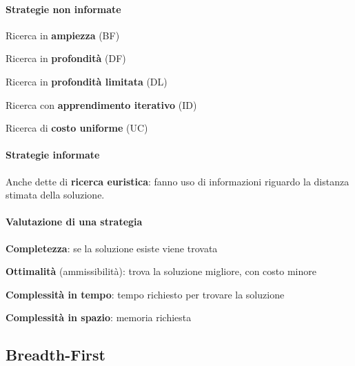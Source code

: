 \documentclass[10pt]{book}
\begin{document}
\paragraph{Strategie non informate}
\begin{list}{}{}
	\item Ricerca in \textbf{ampiezza} (BF)
	\item Ricerca in \textbf{profondità} (DF)
	\item Ricerca in \textbf{profondità limitata} (DL)
	\item Ricerca con \textbf{apprendimento iterativo} (ID)
	\item Ricerca di \textbf{costo uniforme} (UC)
\end{list}
\paragraph{Strategie informate} Anche dette di \textbf{ricerca euristica}: fanno uso di informazioni riguardo la distanza stimata della soluzione.
\paragraph{Valutazione di una strategia}
\begin{list}{}{}
	\item \textbf{Completezza}: se la soluzione esiste viene trovata
	\item \textbf{Ottimalità} (ammissibilità): trova la soluzione migliore, con costo minore
	\item \textbf{Complessità in tempo}: tempo richiesto per trovare la soluzione
	\item \textbf{Complessità in spazio}: memoria richiesta
\end{list}
\subsection{Breadth-First}
\end{document}
